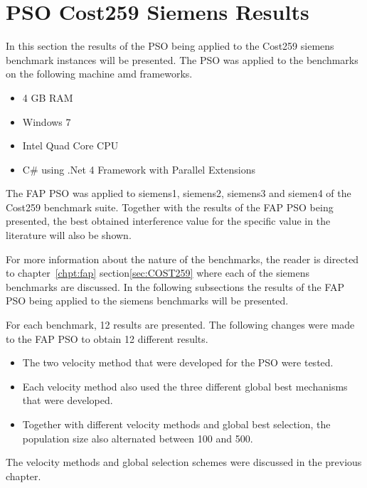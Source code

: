 \section{PSO Cost259 Siemens Results}
In this section the results of the PSO being applied to the Cost259 siemens benchmark instances will be presented. The PSO was applied to the benchmarks on the following machine amd frameworks.
\begin{itemize}
\item 4 GB RAM
\item Windows 7
\item Intel Quad Core CPU
\item C\# using .Net 4 Framework with Parallel Extensions
\end{itemize}
The FAP PSO was applied to siemens1, siemens2, siemens3 and siemen4 of the Cost259 benchmark suite. Together with the results of the FAP PSO being presented, the best obtained interference value for the specific value in the literature will also be shown. 

For more information about the nature of the benchmarks, the reader is directed to chapter~\ref{chpt:fap} section\ref{sec:COST259} where each of the siemens benchmarks are discussed. In the following subsections the results of the FAP PSO being applied to the siemens benchmarks will be presented.

For each benchmark, 12 results are presented. The following changes were made to the FAP PSO to obtain 12 different results.
\begin{itemize}
\item The two velocity method that were developed for the PSO were tested.
\item Each velocity method also used the three different global best mechanisms that were developed.
\item Together with different velocity methods and global best selection, the population size also alternated between 100 and 500.
\end{itemize}
The velocity methods and global selection schemes were discussed in the previous chapter.
